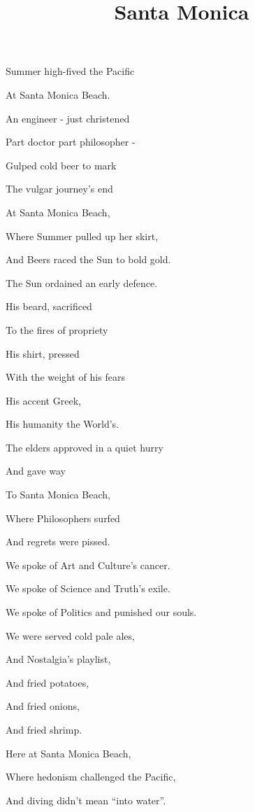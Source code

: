 \documentclass{article}
\title{Santa Monica}
\begin{document}
 \newline

Summer high-fived the Pacific 

At Santa Monica Beach.

An engineer - just christened 

Part doctor part philosopher - 

Gulped cold beer to mark 

The vulgar journey's end

At Santa Monica Beach, 

Where Summer pulled up her skirt,

And Beers raced the Sun to bold gold.

\newline \newline

The Sun ordained an early defence.

His beard, sacrificed 

To the fires of propriety

His shirt, pressed 

With the weight of his fears

His accent Greek, 

His humanity the World's.

The elders approved in a quiet hurry 

And gave way 

To Santa Monica Beach,

Where Philosophers surfed

And regrets were pissed.

\newline \newline

We spoke of Art and Culture's cancer.

We spoke of Science and Truth's exile.

We spoke of Politics and punished our souls.

We were served cold pale ales,

And Nostalgia's playlist,

And fried potatoes,

And fried onions,

And fried shrimp.

Here at Santa Monica Beach,

Where hedonism challenged the Pacific,

And diving didn't mean ``into water''.

\newline \newline
\end{document}
